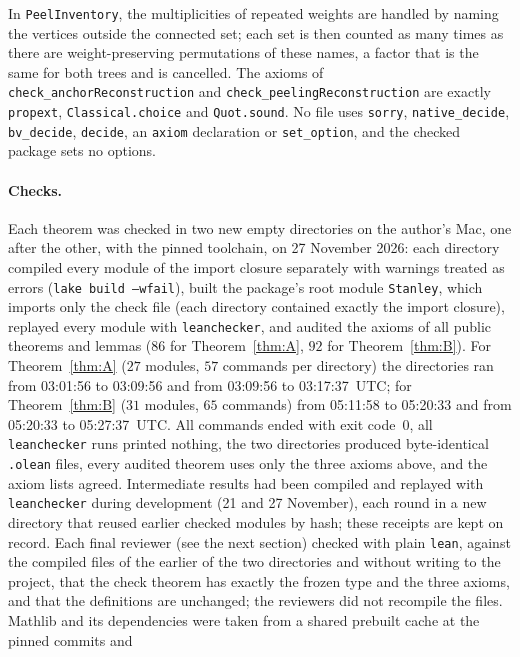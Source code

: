 \documentclass[11pt]{article}
\theoremstyle{definition}
\theoremstyle{remark}
\begin{document}
{\noindent In \texttt{PeelInventory}, the multiplicities of repeated weights are
handled by naming the vertices outside the connected set; each set is then
counted as many times as there are weight-preserving permutations of these
names, a factor that is the same for both trees and is cancelled. The axioms of
\texttt{check\_anchorReconstruction} and \texttt{check\_peelingReconstruction}
are exactly \texttt{propext}, \texttt{Classical.choice} and \texttt{Quot.sound}.
No file uses \texttt{sorry}, \texttt{native\_\allowbreak decide},
\texttt{bv\_\allowbreak decide}, \texttt{decide}, an \texttt{axiom} declaration or
\texttt{set\_option}, and the checked package sets no options.

\paragraph{Checks.} Each theorem was checked in two new empty directories on the
author's Mac, one after the other, with the pinned toolchain, on 27 November
2026: each directory compiled every module of the import closure separately
with warnings treated as errors (\texttt{lake build --wfail}), built the
package's root module \texttt{Stanley}, which imports only the check file (each
directory contained exactly the import closure),
replayed every module with \texttt{leanchecker}, and audited the axioms of all public theorems and lemmas ($86$ for
Theorem~\ref{thm:A}, $92$ for Theorem~\ref{thm:B}). For Theorem~\ref{thm:A} ($27$ modules, $57$ commands per
directory) the directories ran from 03:01:56 to 03:09:56 and from 03:09:56 to
03:17:37~UTC; for Theorem~\ref{thm:B} ($31$ modules, $65$ commands) from 05:11:58
to 05:20:33 and from 05:20:33 to 05:27:37~UTC. All commands ended with exit
code~$0$, all \texttt{leanchecker} runs printed nothing, the two directories
produced byte-identical \texttt{.olean} files, every audited theorem uses
only the three axioms above, and the axiom lists agreed. Intermediate results had been compiled and replayed with \texttt{leanchecker}
during development (21 and 27 November), each round in a new directory that
reused earlier checked modules by hash; these receipts are kept on record. Each final reviewer (see the
next section) checked with plain \texttt{lean}, against the compiled files of the earlier of the two directories and without writing to the project, that the check theorem
has exactly the frozen type and the three axioms, and that the definitions are
unchanged; the reviewers did not recompile the files. Mathlib and its
dependencies were taken from a shared prebuilt cache at the pinned commits and
}
\end{document}
